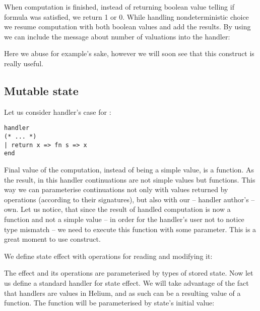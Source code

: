 

When computation is finished, instead of returning boolean value telling if formula was satisfied, we return 1 or 0. While handling nondeterministic choice we resume computation with both boolean values and add the results. By using  we can include the message about number of valuations into the handler:



Here we abuse  for example's sake, however we will soon see that this construct is really useful.

\subsection{Mutable state}

Let us consider handler's case for :

\begin{lstlisting}
handler
(* ... *)
| return x => fn s => x
end
\end{lstlisting}

Final value of the computation, instead of being a simple value, is a function. As the result, in this handler continuations are not simple values but functions. This way we can parameterise continuations not only with values returned by operations (according to their signatures), but also with our -- handler author's -- own. Let us notice, that since the result of handled computation is now a function and not a simple value -- in order for the handler's user not to notice type mismatch -- we need to execute this function with some parameter. This is a great moment to use  construct.

We define state effect with operations for reading and modifying it:



The effect and its operations are parameterised by types of stored state. Now let us define a standard handler for state effect. We will take advantage of the fact that handlers are values in Helium, and as such can be a resulting value of a function. The function will be parameterised by state's initial value:



